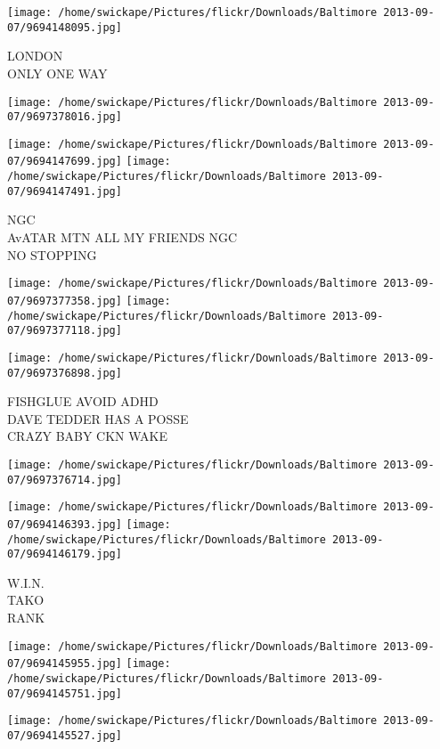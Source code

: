 \documentclass[10pt,letterpaper]{article}
\begin{document}
\vspace{0.25in}
\texttt{[image: /home/swickape/Pictures/flickr/Downloads/Baltimore 2013-09-07/9694148095.jpg]}

LONDON\\
ONLY ONE WAY
\pagebreak

\texttt{[image: /home/swickape/Pictures/flickr/Downloads/Baltimore 2013-09-07/9697378016.jpg]}

\vspace{0.25in}
\texttt{[image: /home/swickape/Pictures/flickr/Downloads/Baltimore 2013-09-07/9694147699.jpg]}
\texttt{[image: /home/swickape/Pictures/flickr/Downloads/Baltimore 2013-09-07/9694147491.jpg]}

NGC\\
AvATAR MTN ALL MY FRIENDS NGC\\
NO STOPPING
\pagebreak

\texttt{[image: /home/swickape/Pictures/flickr/Downloads/Baltimore 2013-09-07/9697377358.jpg]}
\texttt{[image: /home/swickape/Pictures/flickr/Downloads/Baltimore 2013-09-07/9697377118.jpg]}

\texttt{[image: /home/swickape/Pictures/flickr/Downloads/Baltimore 2013-09-07/9697376898.jpg]}

FISHGLUE AVOID ADHD\\
DAVE TEDDER HAS A POSSE\\
CRAZY BABY CKN WAKE
\pagebreak

\texttt{[image: /home/swickape/Pictures/flickr/Downloads/Baltimore 2013-09-07/9697376714.jpg]}

\vspace{0.25in}
\texttt{[image: /home/swickape/Pictures/flickr/Downloads/Baltimore 2013-09-07/9694146393.jpg]}
\texttt{[image: /home/swickape/Pictures/flickr/Downloads/Baltimore 2013-09-07/9694146179.jpg]}

W.I.N.\\
TAKO\\
RANK
\pagebreak

\texttt{[image: /home/swickape/Pictures/flickr/Downloads/Baltimore 2013-09-07/9694145955.jpg]}
\texttt{[image: /home/swickape/Pictures/flickr/Downloads/Baltimore 2013-09-07/9694145751.jpg]}

\vspace{0.25in}
\texttt{[image: /home/swickape/Pictures/flickr/Downloads/Baltimore 2013-09-07/9694145527.jpg]}
\end{document}
